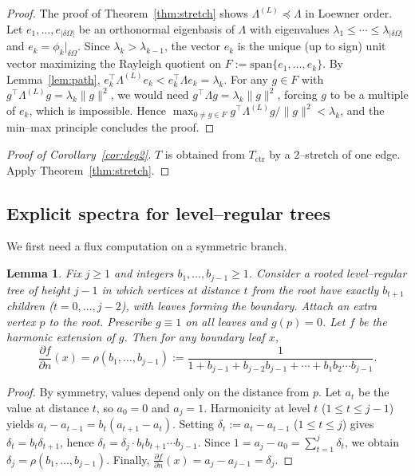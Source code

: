 \documentclass[11pt]{article}
\newtheorem{lemma}[theorem]{Lemma}
\theoremstyle{definition}
\theoremstyle{remark}
\newcommand{\dO}{\delta\Omega}
\begin{document}
\begin{proof}
The proof of Theorem~\ref{thm:stretch} shows $\Lambda^{(L)}\preceq\Lambda$ in Loewner order.
Let $e_1,\dots,e_{|\dO|}$ be an orthonormal eigenbasis of $\Lambda$ with eigenvalues $\lambda_1\le\cdots\le\lambda_{|\dO|}$ and $e_k=\phi_k|_{\dO}$.
Since $\lambda_k>\lambda_{k-1}$, the vector $e_k$ is the unique (up to sign) unit vector maximizing the Rayleigh quotient on $F:=\mathrm{span}\{e_1,\dots,e_k\}$.
By Lemma~\ref{lem:path}, $e_k^\top\Lambda^{(L)}e_k < e_k^\top\Lambda e_k = \lambda_k$.
For any $g\in F$ with $g^\top\Lambda^{(L)}g=\lambda_k\|g\|^2$, we would need $g^\top\Lambda g=\lambda_k\|g\|^2$, forcing $g$ to be a multiple of $e_k$, which is impossible.
Hence $\max_{0\neq g\in F}g^\top\Lambda^{(L)}g/\|g\|^2<\lambda_k$, and the min--max principle concludes the proof.
\end{proof}

\begin{proof}[Proof of Corollary~\ref{cor:deg2}]
$T$ is obtained from $T_{\mathrm{ctr}}$ by a $2$--stretch of one edge. Apply Theorem~\ref{thm:stretch}.
\end{proof}


\subsection{Explicit spectra for level--regular trees}\label{subsec:levelspec}

We first need a flux computation on a symmetric branch.

\begin{lemma}\label{lem:flux}
Fix $j\ge 1$ and integers $b_1,\dots,b_{j-1}\ge 1$.
Consider a rooted level--regular tree of height $j-1$ in which vertices at distance $t$ from the root have exactly $b_{t+1}$ children ($t=0,\dots,j-2$), with leaves forming the boundary.
Attach an extra vertex $p$ to the root.
Prescribe $g\equiv 1$ on all leaves and $g(p)=0$.
Let $f$ be the harmonic extension of $g$.
Then for any boundary leaf $x$,
\begin{equation}\label{eq:rho}
\frac{\partial f}{\partial n}(x)
=\rho(b_1,\dots,b_{j-1})
:=\frac{1}{1+b_{j-1}+b_{j-2}b_{j-1}+\cdots+b_1 b_2\cdots b_{j-1}}.
\end{equation}
\end{lemma}

\begin{proof}
By symmetry, values depend only on the distance from $p$.
Let $a_t$ be the value at distance $t$, so $a_0=0$ and $a_j=1$.
Harmonicity at level $t$ ($1\le t\le j-1$) yields $a_t-a_{t-1}=b_t(a_{t+1}-a_t)$.
Setting $\delta_t:=a_t-a_{t-1}$ ($1\le t\le j$) gives $\delta_t=b_t\delta_{t+1}$, hence $\delta_t=\delta_j\cdot b_t b_{t+1}\cdots b_{j-1}$.
Since $1=a_j-a_0=\sum_{t=1}^j\delta_t$, we obtain $\delta_j=\rho(b_1,\dots,b_{j-1})$.
Finally, $\frac{\partial f}{\partial n}(x)=a_j-a_{j-1}=\delta_j$.
\end{proof}
\end{document}

